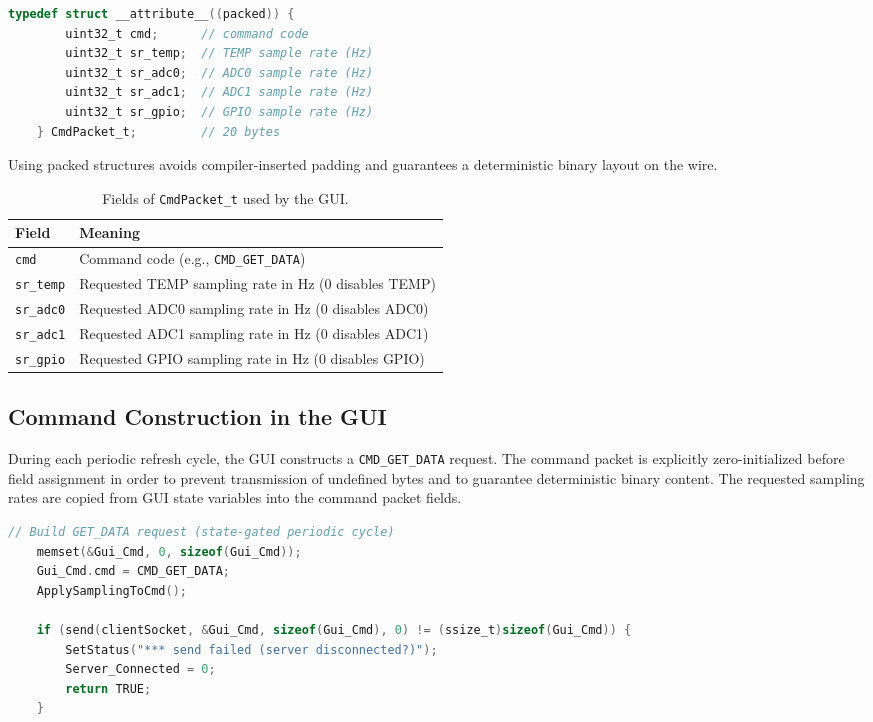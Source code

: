 \begin{lstlisting}[language=C]
	typedef struct __attribute__((packed)) {
		uint32_t cmd;      // command code
		uint32_t sr_temp;  // TEMP sample rate (Hz)
		uint32_t sr_adc0;  // ADC0 sample rate (Hz)
		uint32_t sr_adc1;  // ADC1 sample rate (Hz)
		uint32_t sr_gpio;  // GPIO sample rate (Hz)
	} CmdPacket_t;         // 20 bytes
\end{lstlisting}

Using packed structures avoids compiler-inserted padding and guarantees a deterministic binary layout on the wire.

\begin{table}[H]
	\centering
	\caption{Fields of \texttt{CmdPacket\_t} used by the GUI.}
	\label{tab:cmdpacket_fields}
	\begin{tabular}{ll}
		\hline
		\textbf{Field} & \textbf{Meaning} \\
		\hline
		\texttt{cmd} & Command code (e.g., \texttt{CMD\_GET\_DATA}) \\
		\texttt{sr\_temp} & Requested TEMP sampling rate in Hz (0 disables TEMP) \\
		\texttt{sr\_adc0} & Requested ADC0 sampling rate in Hz (0 disables ADC0) \\
		\texttt{sr\_adc1} & Requested ADC1 sampling rate in Hz (0 disables ADC1) \\
		\texttt{sr\_gpio} & Requested GPIO sampling rate in Hz (0 disables GPIO) \\
		\hline
	\end{tabular}
\end{table}

\subsection{Command Construction in the GUI}
\label{sec:gui_cmd_construction}

During each periodic refresh cycle, the GUI constructs a \texttt{CMD\_GET\_DATA} request. The command packet is explicitly zero-initialized before field assignment in order to prevent transmission of undefined bytes and to guarantee deterministic binary content. The requested sampling rates are copied from GUI state variables into the command packet fields.

\begin{lstlisting}[language=C]
	// Build GET_DATA request (state-gated periodic cycle)
	memset(&Gui_Cmd, 0, sizeof(Gui_Cmd));
	Gui_Cmd.cmd = CMD_GET_DATA;
	ApplySamplingToCmd();
	
	if (send(clientSocket, &Gui_Cmd, sizeof(Gui_Cmd), 0) != (ssize_t)sizeof(Gui_Cmd)) {
		SetStatus("*** send failed (server disconnected?)");
		Server_Connected = 0;
		return TRUE;
	}
\end{lstlisting}

